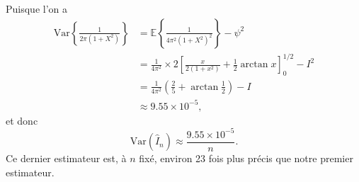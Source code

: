 \documentclass[11pt]{td_um}
\begin{document}
\begin{exo}{}
\begin{enumerate}
{                Puisque l'on a
                \begin{align*}
                    \mbox{Var} \left\{\frac{1}{2 \pi (1 + X^2)} \right\}
                    &= \mathbb{E} \left\{\frac{1}{4 \pi^2 (1 + X^2)^2} \right\} - \psi^2\\
                    &= \frac{1}{4 \pi^2} \times 2 \left[\frac{x}{2 (1 +
                    x^2)} + \frac{1}{2} \arctan x \right]_0^{1/2} - I^2\\
                    &= \frac{1}{4 \pi^2} \left( \frac{2}{5} + \arctan\frac{1}{2} \right) - I\\
                    &\approx 9.55 \times 10^{-5},
                \end{align*}
                et donc
                \begin{equation*}
                    \mbox{Var}(\hat{I}_n) \approx \frac{9.55 \times 10^{-5}}{n}.
                \end{equation*}
                Ce dernier estimateur est, à $n$ fixé, environ 23 fois plus précis
                que notre premier estimateur.

            }
    \end{enumerate}
\end{exo}
\end{document}
